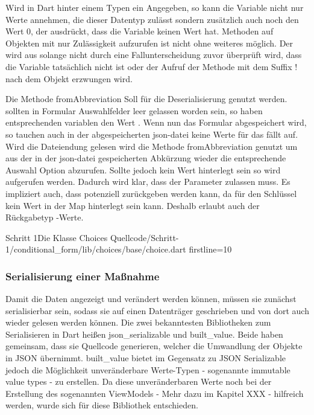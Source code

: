 Wird in Dart hinter einem Typen ein  Angegeben, so kann die Variable nicht nur  Werte annehmen, die dieser Datentyp zulässt sondern zusätzlich auch noch den Wert 0, der  ausdrückt, dass die Variable keinen Wert hat. Methoden auf Objekten mit nur Zulässigkeit aufzurufen ist nicht ohne weiteres möglich.  Der wird aus  solange nicht durch eine Fallunterscheidung zuvor überprüft wird, dass die Variable tatsächlich nicht  ist oder der Aufruf der Methode  mit dem Suffix !  nach dem Objekt erzwungen wird.

Die Methode fromAbbreviation Soll für die Deserialisierung genutzt werden.  sollten in Formular Auswahlfelder leer gelassen worden sein, so haben  entsprechenden variablen den Wert . Wenn nun das Formular abgespeichert wird, so tauchen auch in der abgespeicherten json-datei keine  Werte für das fällt auf. Wird die Dateiendung gelesen wird die Methode fromAbbreviation  genutzt um aus der in der json-datei gespeicherten Abkürzung wieder die entsprechende Auswahl Option abzurufen.  Sollte jedoch kein Wert hinterlegt sein so wird  aufgerufen werden. Dadurch wird klar, dass der Parameter  zulassen muss. Es impliziert auch, dass potenziell  zurückgeben werden kann, da für den Schlüssel  kein Wert in der Map hinterlegt sein kann. Deshalb  erlaubt auch der Rückgabetyp -Werte.




\begin{alexlisting}{Schritt 1}{Die Klasse Choices}
  {Quellcode/Schritt-1/conditional_form/lib/choices/base/choice.dart}
  {firstline=10}
  \label{lst:Schritt1KlasseChoices}
\end{alexlisting}

\subsubsection{Serialisierung einer Maßnahme}

Damit die Daten angezeigt und verändert werden können, müssen sie zunächst serialisierbar sein, sodass sie auf einen Datenträger geschrieben und von dort auch wieder gelesen werden können.
Die zwei bekanntesten Bibliotheken zum Serialisieren in Dart heißen json_serializable und built_value.
Beide haben gemeinsam, dass sie Quellcode generieren, welcher die Umwandlung der Objekte in JSON übernimmt.
built_value bietet im Gegensatz zu JSON Serializable jedoch die Möglichkeit unveränderbare Werte-Typen -  sogenannte immutable value types -  zu erstellen. Da diese  unveränderbaren Werte noch bei der Erstellung des sogenannten ViewModels -  Mehr dazu im Kapitel XXX - hilfreich werden, wurde sich für diese Bibliothek entschieden.

